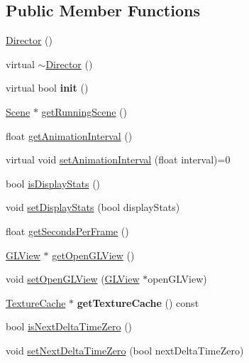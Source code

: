 \subsection*{Public Member Functions}
\begin{DoxyCompactItemize}
\item 
\hyperlink{classDirector_a607a41fe5c42dd9ca7e256a11942a6d7}{Director} ()
\item 
virtual \hyperlink{classDirector_a59d7a588bfd4edd22948a9e7fd8c854a}{$\sim$\+Director} ()
\item 
\mbox{\label{classDirector_aa0c98effd0ca901b5f64f62270777891}} 
virtual bool {\bfseries init} ()
\item 
\hyperlink{classScene}{Scene} $\ast$ \hyperlink{classDirector_a674852932c4b153b4e1ff4ee51ac07b8}{get\+Running\+Scene} ()
\item 
float \hyperlink{classDirector_ad69cc0f9296b7e083f1e91b3a84dad94}{get\+Animation\+Interval} ()
\item 
virtual void \hyperlink{classDirector_a87d84ea16dfb7c991a4fcfd48e8d22ed}{set\+Animation\+Interval} (float interval)=0
\item 
bool \hyperlink{classDirector_a922631f5a39265d96972d63ddb76a7fc}{is\+Display\+Stats} ()
\item 
void \hyperlink{classDirector_a97986d4c3f91e7758316e3f0a0396baa}{set\+Display\+Stats} (bool display\+Stats)
\item 
float \hyperlink{classDirector_a38da2885fd753374ee9e2cd545b9ae4c}{get\+Seconds\+Per\+Frame} ()
\item 
\hyperlink{classGLView}{G\+L\+View} $\ast$ \hyperlink{classDirector_a9480a6fa03967568e72b392e2b53c599}{get\+Open\+G\+L\+View} ()
\item 
void \hyperlink{classDirector_a6c9edb0fdb7c3c7142e90a16b80b0949}{set\+Open\+G\+L\+View} (\hyperlink{classGLView}{G\+L\+View} $\ast$open\+G\+L\+View)
\item 
\mbox{\label{classDirector_a0d0dc7e5b93c1e1dc88d0e8851758a5e}} 
\hyperlink{classTextureCache}{Texture\+Cache} $\ast$ {\bfseries get\+Texture\+Cache} () const
\item 
bool \hyperlink{classDirector_a5f2f66a2f14f63e2a5fabb601c972b8b}{is\+Next\+Delta\+Time\+Zero} ()
\item 
void \hyperlink{classDirector_a809b5dca9ab9d0896d2a9e201e2177ae}{set\+Next\+Delta\+Time\+Zero} (bool next\+Delta\+Time\+Zero)
\item 

\end{DoxyCompactItemize}
